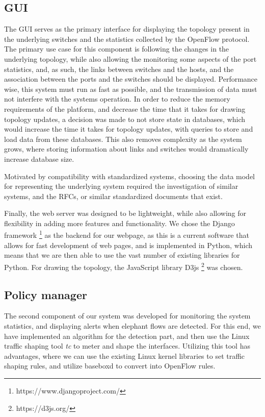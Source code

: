 \pagebreak

\subsection {GUI}

The GUI serves as the primary interface for displaying the topology present in the underlying switches and the statistics collected by the OpenFlow protocol. The primary use case for this component is following the changes 
in the underlying topology, while also allowing the monitoring some aspects of the port statistics, and, as such, the links between switches and the hosts, and the association between the ports and the switches should be displayed. 
Performance wise, this system must run as fast as possible, and the transmission of data must not interfere with the systems operation. In order to reduce the memory requirements of the platform, and decrease the time that 
it takes for drawing topology updates, a decision was made to not store state in databases, which would increase the time it takes for topology updates, with queries to store and load data from these databases. This also 
removes complexity as the system grows, where storing information about links and switches would dramatically increase database size.

\par Motivated by compatibility with standardized systems, choosing the data model for representing the underlying system required the investigation of similar systems, and the RFCs, or similar standardized documents that exist. 

\par Finally, the web server was designed to be lightweight, while also allowing for flexibility in adding more features and functionality. We chose the Django framework \footnote{https://www.djangoproject.com/} as the backend 
for our webpage, as this is a current software that allows for fast development of web pages, and is implemented in Python, which means that we are then able to use the vast number of existing libraries for Python. For
drawing the topology, the JavaScript library D3js \footnote {https://d3js.org/} was chosen.

\subsection {Policy manager}

The second component of our system was developed for monitoring the system statistics, and displaying alerts when elephant flows are detected. For this end, we have implemented an algorithm for the detection part, and then use 
the Linux traffic shaping tool \textit {tc} to meter and shape the interfaces. Utilizing this tool has advantages, where we can use the existing Linux kernel libraries to set traffic shaping rules, and utilize baseboxd to convert
into OpenFlow rules.

